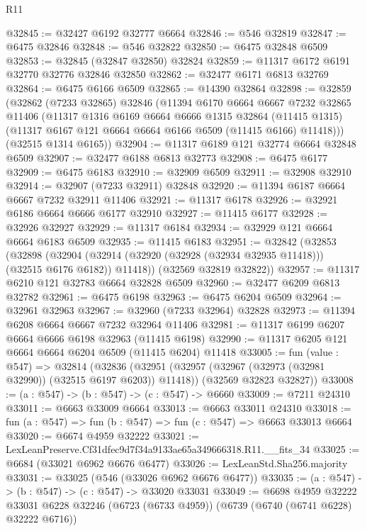 \begin{lexlean}{R11}
\begin{coremodule}
@32845 := @32427 @6192 @32777 @6664
@32846 := @546 @32819
@32847 := @6475 @32846
@32848 := @546 @32822
@32850 := @6475 @32848 @6509
@32853 := @32845 (@32847 @32850) @32824
@32859 := @11317 @6172 @6191 @32770 @32776 @32846 @32850
@32862 := @32477 @6171 @6813 @32769
@32864 := @6475 @6166 @6509
@32865 := @14390 @32864
@32898 := @32859
    (@32862
      (@7233 @32865)
      @32846
      (@11394
        @6170
        @6664
        @6667
        @7232
        @32865
        @11406
        (@11317
          @1316
          @6169
          @6664
          @6666
          @1315
          @32864
          (@11415 @1315)
          (@11317 @6167 @121 @6664 @6664 @6166 @6509 (@11415 @6166) @11418)))
      (@32515 @1314 @6165))
@32904 := @11317 @6189 @121 @32774 @6664 @32848 @6509
@32907 := @32477 @6188 @6813 @32773
@32908 := @6475 @6177
@32909 := @6475 @6183
@32910 := @32909 @6509
@32911 := @32908 @32910
@32914 := @32907 (@7233 @32911) @32848
@32920 := @11394 @6187 @6664 @6667 @7232 @32911 @11406
@32921 := @11317 @6178
@32926 := @32921 @6186 @6664 @6666 @6177 @32910
@32927 := @11415 @6177
@32928 := @32926 @32927
@32929 := @11317 @6184
@32934 := @32929 @121 @6664 @6664 @6183 @6509
@32935 := @11415 @6183
@32951 := @32842
    (@32853
      (@32898
        (@32904 (@32914 (@32920 (@32928 (@32934 @32935 @11418))) (@32515 @6176 @6182)) @11418))
      (@32569 @32819 @32822))
@32957 := @11317 @6210 @121 @32783 @6664 @32828 @6509
@32960 := @32477 @6209 @6813 @32782
@32961 := @6475 @6198
@32963 := @6475 @6204 @6509
@32964 := @32961 @32963
@32967 := @32960 (@7233 @32964) @32828
@32973 := @11394 @6208 @6664 @6667 @7232 @32964 @11406
@32981 := @11317 @6199 @6207 @6664 @6666 @6198 @32963 (@11415 @6198)
@32990 := @11317 @6205 @121 @6664 @6664 @6204 @6509 (@11415 @6204) @11418
@33005 := fun (value : @547) =>
  @32814
    (@32836
      (@32951 (@32957 (@32967 (@32973 (@32981 @32990)) (@32515 @6197 @6203)) @11418))
      (@32569 @32823 @32827))
@33008 := (a : @547) -> (b : @547) -> (c : @547) -> @6660
@33009 := @7211 @24310
@33011 := @6663 @33009 @6664
@33013 := @6663 @33011 @24310
@33018 := fun (a : @547) => fun (b : @547) => fun (c : @547) => @6663 @33013 @6664
@33020 := @6674 @4959 @32222
@33021 := LexLeanPreserve.Cf31dfec9d7f34a9133ae65a349666318.R11.__fits_34
@33025 := @6684 (@33021 @6962 @6676 @6477)
@33026 := LexLeanStd.Sha256.majority
@33031 := @33025 (@546 (@33026 @6962 @6676 @6477))
@33035 := (a : @547) -> (b : @547) -> (c : @547) -> @33020 @33031
@33049 := @6698
    @4959
    @32222
    @33031
    @6228
    @32246
    (@6723 (@6733 @4959))
    (@6739 (@6740 (@6741 @6228) @32222 @6716))

\end{coremodule}
\end{lexlean}

